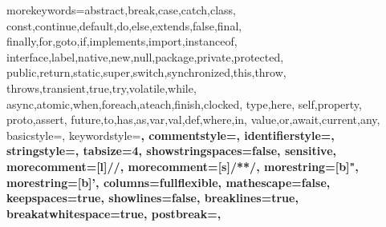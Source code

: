 \usepackage{relsize}
\usepackage{amsmath}
\usepackage{url}

\usepackage{listings}

%
%
  {morekeywords={abstract,break,case,catch,class,%
      const,continue,default,do,else,extends,false,final,%
      finally,for,goto,if,implements,import,instanceof,%
      interface,label,native,new,null,package,private,protected,%
      public,return,static,super,switch,synchronized,this,throw,%
      throws,transient,true,try,volatile,while,%
      async,atomic,when,foreach,ateach,finish,clocked,%
      type,here,%
      self,property,%
      proto,assert,%
      future,to,has,as,var,val,def,where,in,%
      value,or,await,current,any},%
   basicstyle=\normalfont\ttfamily,%
   keywordstyle=\bf\ttfamily,%
   commentstyle=\normalfont\ttfamily,%
   identifierstyle=\normalfont\ttfamily,%
   stringstyle=\normalfont\ttfamily,%
   tabsize=4,%
   showstringspaces=false,%
   sensitive,%
   morecomment=[l]//,%
   morecomment=[s]{/*}{*/},%
   morestring=[b]",%
   morestring=[b]',%
   columns=fullflexible,%
   mathescape=false,%
   keepspaces=true,%
   showlines=false,%
   breaklines=true,%
   breakatwhitespace=true,%
   postbreak={},%
  }

  {\lstset{language=X10,breaklines=false,captionpos=b,xleftmargin=2em,mathescape=true}}
  {}

  {\lstset{language=X10,breaklines=false,captionpos=b}} %
  {}

\lstset{language=x10,basicstyle=\ttfamily\small}


\usepackage[ruled]{algorithm} %
\usepackage[noend]{algorithmic} %
\renewcommand\algorithmiccomment[1]{// \textit{#1}} %


\usepackage{microtype}


\usepackage{pslatex}


\usepackage{xspace}
\usepackage{yglabels}
\usepackage{yglang}
\usepackage{ygequation}
\usepackage{graphicx}

